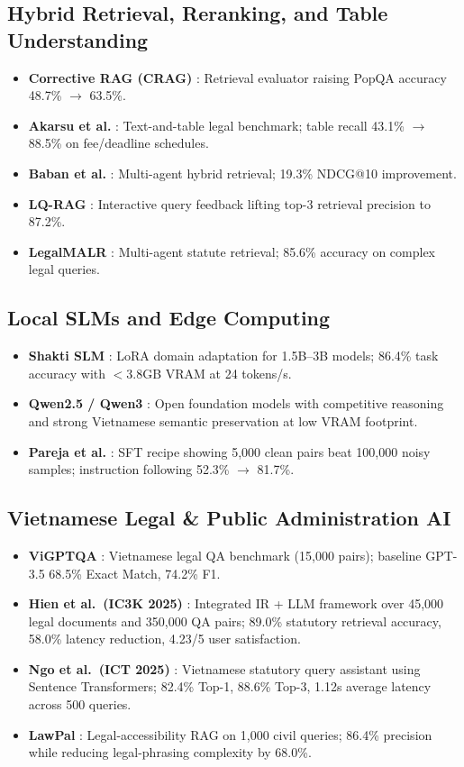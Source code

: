 \documentclass[11pt,a4paper]{article}
\begin{document}
\subsection{Hybrid Retrieval, Reranking, and Table Understanding}
\begin{itemize}
\item \textbf{Corrective RAG (CRAG)} \cite{crag}: Retrieval evaluator raising PopQA accuracy 48.7\%
$\rightarrow$ 63.5\%.
\item \textbf{Akarsu et al.} \cite{akarsu}: Text-and-table legal benchmark; table recall 43.1\%
$\rightarrow$ 88.5\% on fee/deadline schedules.
\item \textbf{Baban et al.} \cite{baban}: Multi-agent hybrid retrieval; 19.3\% NDCG@10 improvement.
\item \textbf{LQ-RAG} \cite{lqrag}: Interactive query feedback lifting top-3 retrieval precision to
87.2\%.
\item \textbf{LegalMALR} \cite{legalmalr}: Multi-agent statute retrieval; 85.6\% accuracy on complex
legal queries.
\end{itemize}

\subsection{Local SLMs and Edge Computing}
\begin{itemize}
\item \textbf{Shakti SLM} \cite{shakti}: LoRA domain adaptation for 1.5B--3B models; 86.4\% task
accuracy with $<$3.8GB VRAM at 24 tokens/s.
\item \textbf{Qwen2.5 / Qwen3} \cite{qwen}: Open foundation models with competitive reasoning and strong
Vietnamese semantic preservation at low VRAM footprint.
\item \textbf{Pareja et al.} \cite{pareja}: SFT recipe showing 5,000 clean pairs beat 100,000 noisy
samples; instruction following 52.3\% $\rightarrow$ 81.7\%.
\end{itemize}

\subsection{Vietnamese Legal \& Public Administration AI}
\begin{itemize}
\item \textbf{ViGPTQA} \cite{vigptqa}: Vietnamese legal QA benchmark (15,000 pairs); baseline GPT-3.5
68.5\% Exact Match, 74.2\% F1.
\item \textbf{Hien et al.\ (IC3K 2025)} \cite{hien}: Integrated IR + LLM framework over 45,000 legal
documents and 350,000 QA pairs; 89.0\% statutory retrieval accuracy, 58.0\% latency reduction, 4.23/5
user satisfaction.
\item \textbf{Ngo et al.\ (ICT 2025)} \cite{ngo}: Vietnamese statutory query assistant using Sentence
Transformers; 82.4\% Top-1, 88.6\% Top-3, 1.12s average latency across 500 queries.
\item \textbf{LawPal} \cite{lawpal}: Legal-accessibility RAG on 1,000 civil queries; 86.4\% precision
while reducing legal-phrasing complexity by 68.0\%.
\end{itemize}
\end{document}

